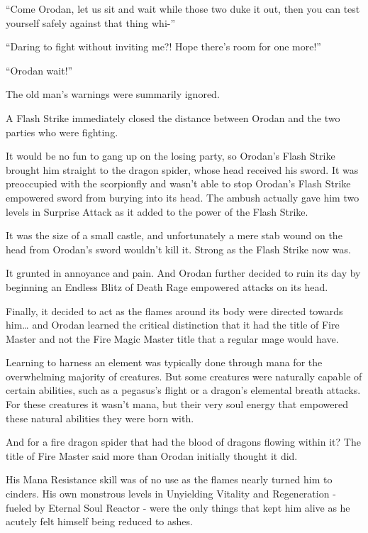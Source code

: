 \documentclass[a4paper,10pt]{book}
\begin{document}
“Come Orodan, let us sit and wait while those two duke it out, then you can test yourself safely against that thing whi-”\par
“Daring to fight without inviting me?! Hope there’s room for one more!”\par
“Orodan wait!”\par
The old man’s warnings were summarily ignored.\par
A Flash Strike immediately closed the distance between Orodan and the two parties who were fighting.\par
It would be no fun to gang up on the losing party, so Orodan’s Flash Strike brought him straight to the dragon spider, whose head received his sword. It was preoccupied with the scorpionfly and wasn’t able to stop Orodan’s Flash Strike empowered sword from burying into its head. The ambush actually gave him two levels in Surprise Attack as it added to the power of the Flash Strike.\par
It was the size of a small castle, and unfortunately a mere stab wound on the head from Orodan’s sword wouldn’t kill it. Strong as the Flash Strike now was.\par
It grunted in annoyance and pain. And Orodan further decided to ruin its day by beginning an Endless Blitz of Death Rage empowered attacks on its head.\par
Finally, it decided to act as the flames around its body were directed towards him… and Orodan learned the critical distinction that it had the title of Fire Master and not the Fire Magic Master title that a regular mage would have.\par
Learning to harness an element was typically done through mana for the overwhelming majority of creatures. But some creatures were naturally capable of certain abilities, such as a pegasus’s flight or a dragon’s elemental breath attacks. For these creatures it wasn’t mana, but their very soul energy that empowered these natural abilities they were born with.\par
And for a fire dragon spider that had the blood of dragons flowing within it? The title of Fire Master said more than Orodan initially thought it did.\par
His Mana Resistance skill was of no use as the flames nearly turned him to cinders. His own monstrous levels in Unyielding Vitality and Regeneration - fueled by Eternal Soul Reactor - were the only things that kept him alive as he acutely felt himself being reduced to ashes.\par
\end{document}
